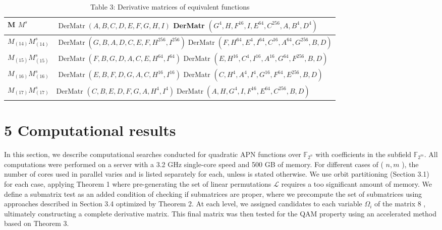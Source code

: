 \documentclass[10pt]{article}
\begin{document}
\begin{table}[h]
\begin{center}
\begin{tabular}{|l|l|}
\hline
M $M^{s}$ & $\operatorname{DerMatr}(A, B, C, D, E, F, G, H, I)$ DerMatr $\left(G^{4}, H, F^{16}, I, E^{64}, C^{256}, A, B^{4}, D^{4}\right)$ \\
\hline
$M_{(14)} M_{(14)}^{s}$ & $\operatorname{DerMatr}\left(G, B, A, D, C, E, F, H^{256}, I^{256}\right) \operatorname{DerMatr}\left(F, H^{64}, E^{4}, I^{64}, C^{16}, A^{64}, G^{256}, B, D\right)$ \\
\hline
$M_{(15)} M_{(15)}^{s}$ & $\operatorname{DerMatr}\left(F, B, G, D, A, C, E, H^{64}, I^{64}\right)$ DerMatr $\left(E, H^{16}, C^{4}, I^{16}, A^{16}, G^{64}, F^{256}, B, D\right)$ \\
\hline
$M_{(16)} M_{(16)}^{s}$ & $\operatorname{DerMatr}\left(E, B, F, D, G, A, C, H^{16}, I^{16}\right)$ DerMatr $\left(C, H^{4}, A^{4}, I^{4}, G^{16}, F^{64}, E^{256}, B, D\right)$ \\
\hline
$M_{(17)} M_{(17)}^{s}$ & DerMatr $\left(C, B, E, D, F, G, A, H^{4}, I^{4}\right) \operatorname{DerMatr}\left(A, H, G^{4}, I, F^{16}, E^{64}, C^{256}, B, D\right)$ \\
\hline
\end{tabular}
\captionsetup{labelformat=empty}
\caption{Table 3: Derivative matrices of equivalent functions}
\end{center}
\end{table}

\section*{5 Computational results}
In this section, we describe computational searches conducted for quadratic APN functions over $\mathbb{F}_{2^{n}}$ with coefficients in the subfield $\mathbb{F}_{2^{m}}$. All computations were performed on a server with a 3.2 GHz single-core speed and 500 GB of memory. For different cases of ( $n, m$ ), the number of cores used in parallel varies and is listed separately for each, unless is stated otherwise. We use orbit partitioning (Section 3.1) for each case, applying Theorem 1 where pre-generating the set of linear permutations $\mathcal{L}$ requires a too significant amount of memory. We define a submatrix test as an added condition of checking if submatrices are proper, where we precompute the set of submatrices using approaches described in Section 3.4 optimized by Theorem 2. At each level, we assigned candidates to each variable $\Omega_{i}$ of the matrix 8 , ultimately constructing a complete derivative matrix. This final matrix was then tested for the QAM property using an accelerated method based on Theorem 3.
\end{document}
